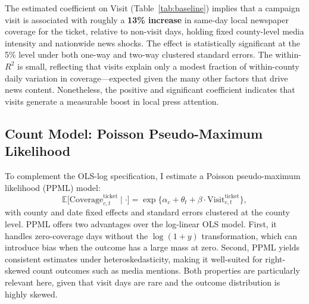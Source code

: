 \documentclass{article}
\begin{document}
The estimated coefficient on Visit (Table~\ref{tab:baseline}) implies that a campaign
visit is associated with roughly a \textbf{13\% increase} in same-day local newspaper
coverage for the ticket, relative to non-visit days, holding fixed county-level media
intensity and nationwide news shocks.
The effect is statistically significant at the 5\% level under both one-way and two-way
clustered standard errors.
The within-$R^2$ is small, reflecting that visits explain only a modest fraction of
within-county daily variation in coverage---expected given the many other factors that
drive news content.
Nonetheless, the positive and significant coefficient indicates that visits generate a
measurable boost in local press attention.


\subsection*{Count Model: Poisson Pseudo-Maximum Likelihood}

To complement the OLS-log specification, I estimate a Poisson pseudo-maximum likelihood
(PPML) model:
\begin{equation}
\mathbb{E}\big[\text{Coverage}_{c,t}^{\text{ticket}} \mid \cdot\big]
= \exp\!\big\{\alpha_c + \theta_t + \beta \cdot \text{Visit}_{c,t}^{\text{ticket}}\big\},
\label{eq:ppml}
\end{equation}
with county and date fixed effects and standard errors clustered at the county level.
PPML offers two advantages over the log-linear OLS model.
First, it handles zero-coverage days without the $\log(1+y)$ transformation, which can
introduce bias when the outcome has a large mass at zero.
Second, PPML yields consistent estimates under heteroskedasticity, making it well-suited
for right-skewed count outcomes such as media mentions.
Both properties are particularly relevant here, given that visit days are rare and the
outcome distribution is highly skewed.
\end{document}
